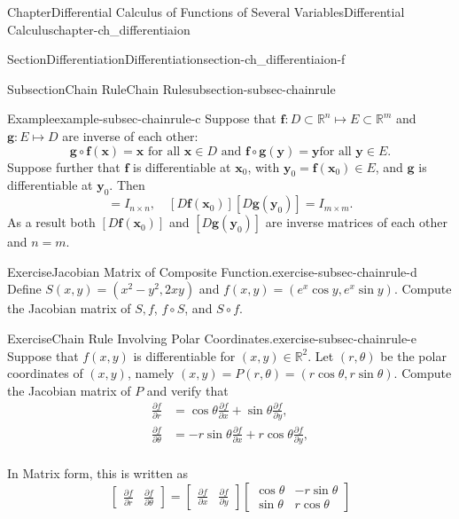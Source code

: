 \documentclass[oneside,10pt,]{book}
\numberwithin{equation}{section}
\newcommand{\bx}{\mathbf{x}}
\newcommand{\by}{\mathbf{y}}
\newcommand{\bbR}{\mathbb{R}}
\begin{document}
\begin{chapterptx}{Chapter}{Differential Calculus of Functions of Several Variables}{}{Differential Calculus}{}{}{chapter-ch_differentiaion}
\begin{sectionptx}{Section}{Differentiation}{}{Differentiation}{}{}{section-ch_differentiaion-f}
\begin{subsectionptx}{Subsection}{Chain Rule}{}{Chain Rule}{}{}{subsection-subsec-chainrule}
\begin{example}{Example}{}{example-subsec-chainrule-c}
Suppose that \(\mathbf f:D\subset \bbR^n\mapsto E\subset \bbR^m\) and \(\mathbf g:E \mapsto D\) are inverse of each other:%
\begin{equation*}
{\mathbf g}\circ {\mathbf f}(\bx)=\bx \text{ for all $\bx\in D$ and ${\mathbf f}\circ {\mathbf g}(\by)=\by$
for all $\by \in E$.}
\end{equation*}
Suppose further that \(\mathbf f\) 	 is differentiable at \(\bx_0\), with \(\by_0=\mathbf f(\bx_0) \in E\), and \(\mathbf g\) is differentiable at \(\by_0\). Then%
\begin{equation*}
[D \mathbf g(\by_{0})] [D\mathbf f(\bx_{0})] =I_{n\times n}, \quad
[D \mathbf f(\bx_{0})] [D \mathbf g(\by_{0})]=I_{m\times m}.
\end{equation*}
As a result  both \([D \mathbf f(\bx_{0})]\) and \([D \mathbf g(\by_{0})]\) are inverse matrices of each other  and \(n=m\).\end{example}
\begin{inlineexercise}{Exercise}{Jacobian Matrix of Composite Function.}{exercise-subsec-chainrule-d}%
Define \(S(x, y)=(x^{2}-y^{2}, 2 x y)\) and \(f(x, y)=(e^{x}\cos y, e^{x}\sin y)\). Compute the Jacobian matrix of \(S, f\), \(f\circ S\), and \(S\circ f\).\end{inlineexercise}%
\begin{inlineexercise}{Exercise}{Chain Rule Involving Polar Coordinates.}{exercise-subsec-chainrule-e}%
Suppose that \(f(x, y)\) is differentiable for \((x, y)\in \bbR^2\). Let \((r, \theta)\) be the polar coordinates of \((x, y)\), namely \((x, y)=P(r,\theta)=(r\cos\theta, r\sin\theta)\). Compute the Jacobian matrix of \(P\) and verify that%
\begin{align*}
\frac{\partial f}{\partial r} &= \cos \theta \frac{\partial f}{\partial x} +\sin \theta \frac{\partial f}{\partial y},\\
\frac{\partial f}{\partial \theta} &= - r\sin \theta \frac{\partial f}{\partial x} +r \cos \theta \frac{\partial f}{\partial y},\\
\end{align*}
%
\par
In Matrix form, this is written as%
\begin{equation*}
\begin{bmatrix} 
\frac{\partial f}{\partial r} & \frac{\partial f}{\partial \theta} 
\end{bmatrix} = \begin{bmatrix} 
\frac{\partial f}{\partial x} & \frac{\partial f}{\partial y} 
\end{bmatrix}  \begin{bmatrix} \cos \theta  & -r \sin\theta \\ \sin\theta & r\cos\theta

\end{bmatrix}
\end{equation*}
\end{inlineexercise}
\end{subsectionptx}
\end{sectionptx}
\end{chapterptx}
\end{document}
